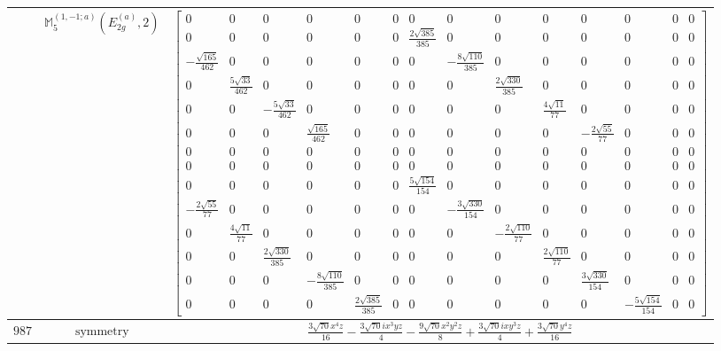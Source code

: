 \documentclass[fleqn,8pt,landscape]{jsarticle}
\begin{document}
\begin{longtable}{ccc}
$  $ & $ \mathbb{M}_{5}^{(1,-1;a)}(E_{2g}^{(a)},2) $ & $ \begin{bmatrix} 0 & 0 & 0 & 0 & 0 & 0 & 0 & 0 & 0 & 0 & 0 & 0 & 0 & 0 \\ 0 & 0 & 0 & 0 & 0 & 0 & \frac{2 \sqrt{385}}{385} & 0 & 0 & 0 & 0 & 0 & 0 & 0 \\ - \frac{\sqrt{165}}{462} & 0 & 0 & 0 & 0 & 0 & 0 & - \frac{8 \sqrt{110}}{385} & 0 & 0 & 0 & 0 & 0 & 0 \\ 0 & \frac{5 \sqrt{33}}{462} & 0 & 0 & 0 & 0 & 0 & 0 & \frac{2 \sqrt{330}}{385} & 0 & 0 & 0 & 0 & 0 \\ 0 & 0 & - \frac{5 \sqrt{33}}{462} & 0 & 0 & 0 & 0 & 0 & 0 & \frac{4 \sqrt{11}}{77} & 0 & 0 & 0 & 0 \\ 0 & 0 & 0 & \frac{\sqrt{165}}{462} & 0 & 0 & 0 & 0 & 0 & 0 & - \frac{2 \sqrt{55}}{77} & 0 & 0 & 0 \\ 0 & 0 & 0 & 0 & 0 & 0 & 0 & 0 & 0 & 0 & 0 & 0 & 0 & 0 \\ 0 & 0 & 0 & 0 & 0 & 0 & 0 & 0 & 0 & 0 & 0 & 0 & 0 & 0 \\ 0 & 0 & 0 & 0 & 0 & 0 & \frac{5 \sqrt{154}}{154} & 0 & 0 & 0 & 0 & 0 & 0 & 0 \\ - \frac{2 \sqrt{55}}{77} & 0 & 0 & 0 & 0 & 0 & 0 & - \frac{3 \sqrt{330}}{154} & 0 & 0 & 0 & 0 & 0 & 0 \\ 0 & \frac{4 \sqrt{11}}{77} & 0 & 0 & 0 & 0 & 0 & 0 & - \frac{2 \sqrt{110}}{77} & 0 & 0 & 0 & 0 & 0 \\ 0 & 0 & \frac{2 \sqrt{330}}{385} & 0 & 0 & 0 & 0 & 0 & 0 & \frac{2 \sqrt{110}}{77} & 0 & 0 & 0 & 0 \\ 0 & 0 & 0 & - \frac{8 \sqrt{110}}{385} & 0 & 0 & 0 & 0 & 0 & 0 & \frac{3 \sqrt{330}}{154} & 0 & 0 & 0 \\ 0 & 0 & 0 & 0 & \frac{2 \sqrt{385}}{385} & 0 & 0 & 0 & 0 & 0 & 0 & - \frac{5 \sqrt{154}}{154} & 0 & 0 \end{bmatrix} $ \\ \hline
$ 987 $ & $ \text{symmetry} $ & $ \frac{3 \sqrt{70} x^{4} z}{16} - \frac{3 \sqrt{70} i x^{3} y z}{4} - \frac{9 \sqrt{70} x^{2} y^{2} z}{8} + \frac{3 \sqrt{70} i x y^{3} z}{4} + \frac{3 \sqrt{70} y^{4} z}{16} $ \\

\end{longtable}
\end{document}
